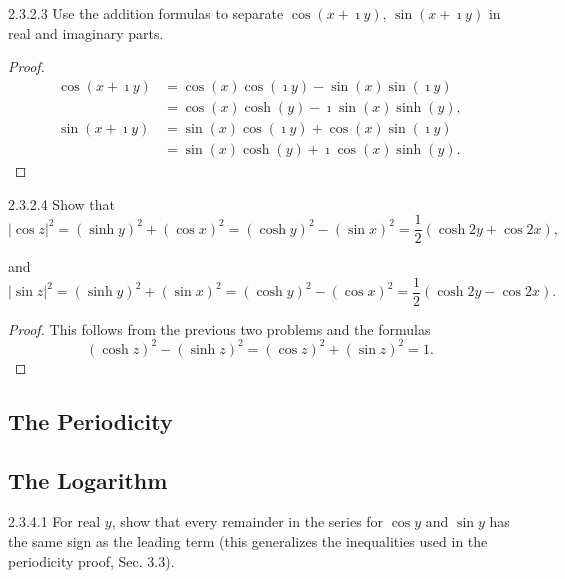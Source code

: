 \begin{problem}{2.3.2.3}
Use the addition formulas to separate \( \cos(x+\imath y) \), \( \sin(x+\imath y) \) in real and imaginary parts.
\end{problem}

\begin{proof}
	\begingroup
	\allowdisplaybreaks%
	\begin{align*}
		\cos(x + \imath y) & = \cos(x)\cos(\imath y) - \sin(x)\sin(\imath y) \\
		                   & = \cos(x)\cosh(y) - \imath\sin(x)\sinh(y),      \\
		\sin(x + \imath y) & = \sin(x)\cos(\imath y) + \cos(x)\sin(\imath y) \\
		                   & = \sin(x)\cosh(y) + \imath \cos(x)\sinh(y).
	\end{align*}
	\endgroup
\end{proof}

\begin{problem}{2.3.2.4}
Show that
\[
	{|\cos z|}^{2} = {(\sinh y)}^{2} + {(\cos x)}^{2} = {(\cosh y)}^{2} - {(\sin x)}^{2} = \dfrac{1}{2} (\cosh 2y + \cos 2x),
\]

and
\[
	{|\sin z|}^{2} = {(\sinh y)}^{2} + {(\sin x)}^{2} = {(\cosh y)}^{2} - {(\cos x)}^{2} = \dfrac{1}{2} (\cosh 2y - \cos 2x).
\]
\end{problem}

\begin{proof}
	This follows from the previous two problems and the formulas
	\[
		{(\cosh z)}^{2} - {(\sinh z)}^{2} = {(\cos z)}^{2} + {(\sin z)}^{2} = 1.
	\]
\end{proof}

\subsection{The Periodicity}

\subsection{The Logarithm}

\begin{problem}{2.3.4.1}
For real \( y \), show that every remainder in the series for \( \cos y \) and \( \sin y \) has the same sign as the leading term (this generalizes the inequalities used in the periodicity proof, Sec. 3.3).
\end{problem}

